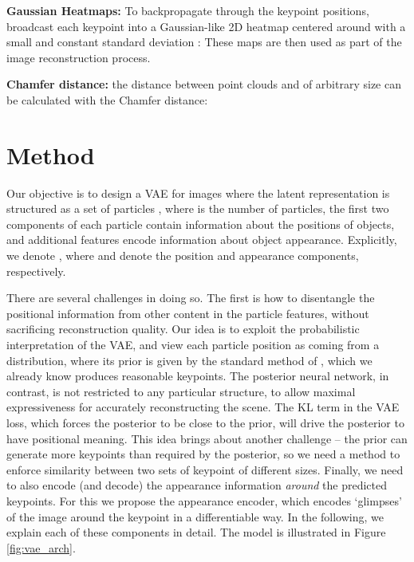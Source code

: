 \documentclass[nohyperref]{article}
\theoremstyle{plain}
\theoremstyle{definition}
\theoremstyle{remark}
\begin{document}
\textbf{Gaussian Heatmaps:} To backpropagate through the keypoint positions, \citet{jakab2018unsupervised} broadcast each keypoint  into a Gaussian-like 2D heatmap centered around  with a small and constant standard deviation :  These maps are then used as part of the image reconstruction process.

\textbf{Chamfer distance:} the distance between point clouds  and  of arbitrary size can be calculated with the Chamfer distance: 
\section{Method}
\label{sec:method}

Our objective is to design a VAE for images  where the latent representation is structured as a set of particles , where  is the number of particles, the first two components of each particle contain information about the positions of objects, and  additional features encode information about object appearance. Explicitly, we denote , where  and  denote the position and appearance components, respectively.

There are several challenges in doing so. 
The first is how to disentangle the positional information from other content in the particle features, without sacrificing reconstruction quality. Our idea is to exploit the probabilistic interpretation of the VAE, and view each particle position as coming from a distribution, where its prior is given by the standard method of \citet{jakab2018unsupervised}, which we already know produces reasonable keypoints. The posterior neural network, in contrast, is not restricted to any particular structure, to allow maximal expressiveness for accurately reconstructing the scene. The KL term in the VAE loss, which forces the posterior to be close to the prior, will drive the posterior to have positional meaning. This idea brings about another challenge -- the prior can generate more keypoints than required by the posterior, so we need a method to enforce similarity between two sets of keypoint of different sizes. Finally, we need to also encode (and decode) the appearance information \textit{around} the predicted keypoints. For this we propose the appearance encoder, which encodes `glimpses' of the image around the keypoint in a differentiable way. In the following, we explain each of these components in detail. The model is illustrated in Figure \ref{fig:vae_arch}.
\end{document}
